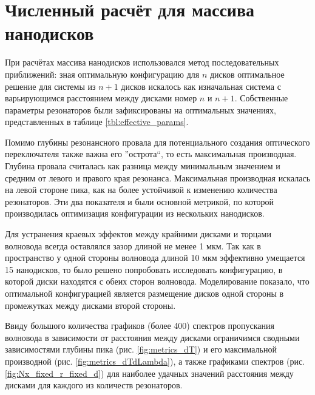 \section{Численный расчёт для массива нанодисков}

При расчётах массива нанодисков использовался метод последовательных приближений: зная оптимальную конфигурацию для $n$ дисков оптимальное решение для системы из $n+1$ дисков искалось как изначальная система с варьирующимся расстоянием между дисками номер $n$ и $n+1$. Собственные параметры резонаторов были зафиксированы на оптимальных значениях, представленных в таблице \ref{tbl:effective_params}.

Помимо глубины резонансного провала для потенциального создания оптического переключателя также важна его ''острота``, то есть максимальная производная. Глубина провала считалась как разница между минимальным значением и средним от левого и правого края резонанса. Максимальная производная искалась на левой стороне пика, как на более устойчивой к изменению количества резонаторов. Эти два показателя и были основной метрикой, по которой производилась оптимизация конфигурации из нескольких нанодисков.

Для устранения краевых эффектов между крайними дисками и торцами волновода всегда оставлялся зазор длиной не менее 1 мкм. Так как в пространство у одной стороны волновода длиной 10 мкм эффективно умещается 15 нанодисков, то было решено попробовать исследовать конфигурацию, в которой диски находятся с обеих сторон волновода. Моделирование показало, что оптимальной конфигурацией является размещение дисков одной стороны в промежутках между дисками второй стороны.

Ввиду большого количества графиков (более 400) спектров пропускания волновода в зависимости от расстояния между дисками ограничимся сводными зависимостями глубины пика (рис. \ref{fig:metrics_dT}) и его максимальной производной (рис. \ref{fig:metrics_dTdLambda}), а также графиками спектров (рис. \ref{fig:Nx_fixed_r_fixed_d}) для наиболее удачных значений расстояния между дисками для каждого из количеств резонаторов.

